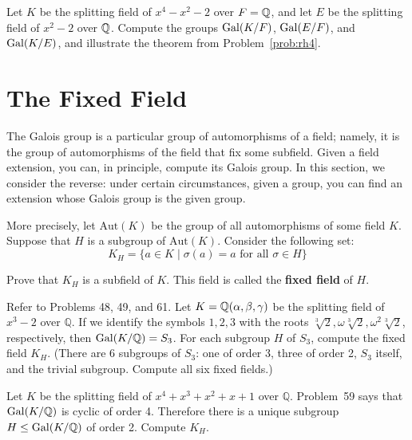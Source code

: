 \begin{problem}
    Let $K$ be the splitting field of $x^4-x^2-2$ over $F=\mathbb{Q}$, and let $E$ be the splitting field of $x^2-2$ over $\mathbb{Q}$. Compute the groups $\operatorname{Gal}(K/F)$, $\operatorname{Gal}(E/F)$, and $\operatorname{Gal}(K/E)$, and illustrate the theorem from Problem~\ref{prob:rh4}.
\end{problem}




\section{The Fixed Field}

The Galois group is a particular group of automorphisms of a field; namely, it is the group of automorphisms of the field that fix some subfield.  Given a field extension, you can, in principle, compute its Galois group.  In this section, we consider the reverse: under certain circumstances, given a group, you can find an extension whose Galois group is the given group. \smallskip

More precisely, let $\mbox{Aut}(K)$ be the group of all automorphisms of some field $K$.  Suppose that $H$ is a subgroup of $\mbox{Aut}(K)$.  Consider the following set:
$$K_H = \{a \in K \mid \sigma(a) = a \mbox{ for all } \sigma \in H\}$$

\begin{problem}
 Prove that $K_H$ is a subfield of $K$.  This field is called the \textbf{fixed field} of $H$.
\end{problem}



\begin{problem}\label{prob:ff1}
Refer to Problems 48, 49, and 61. Let $K=\mathbb{Q}(\alpha,\beta,\gamma)$ be the splitting field of $x^3-2$ over $\mathbb{Q}$.  If we identify the symbols $1,2,3$ with the roots $\sqrt[3]{2}, \omega\sqrt[3]{2}, \omega^2\sqrt[3]{2}$, respectively, then $\operatorname{Gal}(K/\mathbb{Q}) = S_3$.  For each subgroup $H$ of $S_3$, compute the fixed field $K_H$.  (There are 6 subgroups of $S_3$: one of order 3, three of order 2, $S_3$ itself, and the trivial subgroup.  Compute all six fixed fields.)
\end{problem}



\begin{problem}\label{prob:ff2}
Let $K$ be the splitting field of $x^4+x^3+x^2+x+1$ over $\mathbb{Q}$.  Problem~59 says that $\operatorname{Gal}(K/\mathbb{Q})$ is cyclic of order 4.  Therefore there is a unique subgroup $H \leq \operatorname{Gal}(K/\mathbb{Q})$ of order 2.  Compute $K_H$.
\end{problem}



